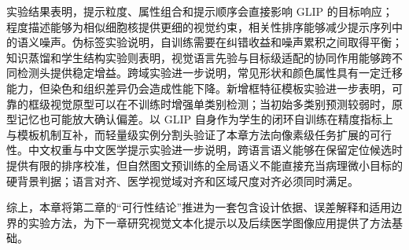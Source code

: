 实验结果表明，提示粒度、属性组合和提示顺序会直接影响 GLIP 的目标响应；程度描述能够为相似细胞核提供更细的视觉约束，相关性排序能够减少提示序列中的语义噪声。伪标签实验说明，自训练需要在纠错收益和噪声累积之间取得平衡；知识蒸馏和学生结构实验则表明，视觉语言先验与目标级适配的协同作用能够跨不同检测头提供稳定增益。跨域实验进一步说明，常见形状和颜色属性具有一定迁移能力，但染色和组织差异仍会造成性能下降。新增框特征模板实验进一步表明，可靠的框级视觉原型可以在不训练时增强单类别检测；当初始多类别预测较弱时，原型记忆也可能放大确认偏差。以 GLIP 自身作为学生的闭环自训练在精度指标上与模板机制互补，而轻量级实例分割头验证了本章方法向像素级任务扩展的可行性。中文权重与中文医学提示实验进一步说明，跨语言语义能够在保留定位候选时提供有限的排序校准，但自然图文预训练的全局语义不能直接充当病理微小目标的硬背景判据；语言对齐、医学视觉域对齐和区域尺度对齐必须同时满足。

综上，本章将第二章的“可行性结论”推进为一套包含设计依据、误差解释和适用边界的实验方法，为下一章研究视觉文本化提示以及后续医学图像应用提供了方法基础。
